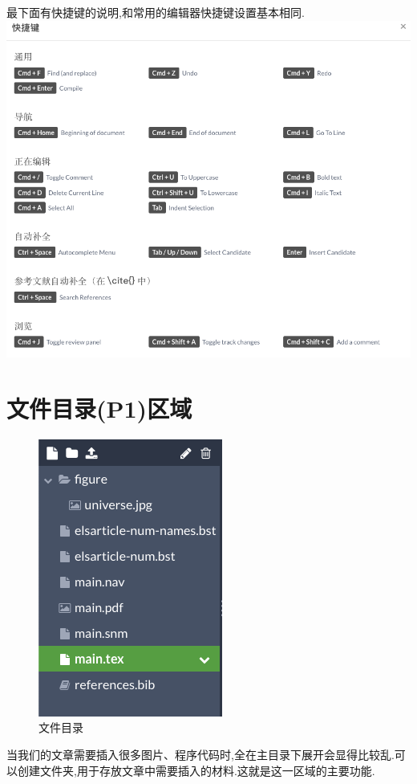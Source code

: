 \documentclass[]{ctexbook}
\begin{document}
最下面有快捷键的说明,和常用的编辑器快捷键设置基本相同.
\includegraphics{figure/hotkey.png}

\hypertarget{p1}{%
\section{文件目录(P1)区域}\label{p1}}

\begin{figure}
\centering
\includegraphics{figure/P1.png}
\caption{文件目录}
\end{figure}

当我们的文章需要插入很多图片、程序代码时,全在主目录下展开会显得比较乱.可以创建文件夹,用于存放文章中需要插入的材料.这就是这一区域的主要功能.
\end{document}
